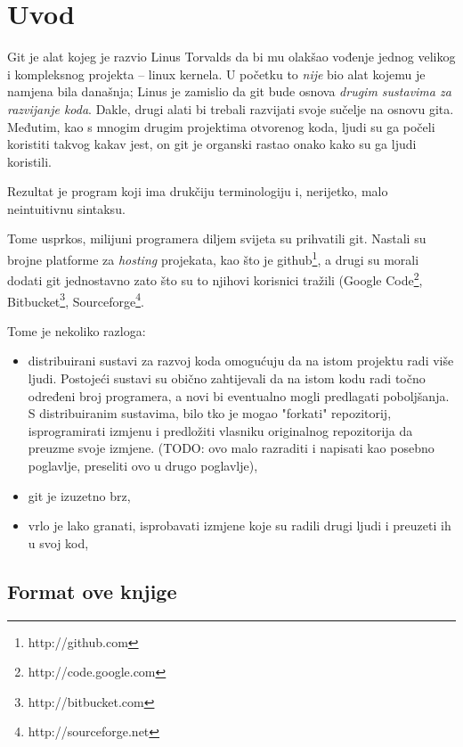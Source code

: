 \chapter*{Uvod}

Git je alat kojeg je razvio Linus Torvalds da bi mu olakšao vođenje jednog velikog i kompleksnog projekta -- linux kernela.
U početku to \textit{nije} bio alat kojemu je namjena bila današnja; Linus je zamislio da git bude osnova \textit{drugim sustavima za razvijanje koda}.
Dakle, drugi alati bi trebali razvijati svoje sučelje na osnovu gita.
Međutim, kao s mnogim drugim projektima otvorenog koda, ljudi su ga počeli koristiti takvog kakav jest, on git je organski rastao onako kako su ga ljudi koristili.

Rezultat je program koji ima drukčiju terminologiju i, nerijetko, malo neintuitivnu sintaksu. 

Tome usprkos, milijuni programera diljem svijeta su prihvatili git. 
Nastali su brojne platforme za \textit{hosting} projekata, kao što je github\footnote{http://github.com}, a drugi su morali dodati git jednostavno zato što su to njihovi korisnici tražili (Google Code\footnote{http://code.google.com}, Bitbucket\footnote{http://bitbucket.com}, Sourceforge\footnote{http://sourceforge.net}.

Tome je nekoliko razloga:

\begin{itemize}
	\item distribuirani sustavi za razvoj koda omogućuju da na istom projektu radi više ljudi. Postojeći sustavi su obično zahtijevali da na istom kodu radi točno određeni broj programera, a novi bi eventualno mogli predlagati poboljšanja. S distribuiranim sustavima, bilo tko je mogao "forkati" repozitorij, isprogramirati izmjenu i predložiti vlasniku originalnog repozitorija da preuzme svoje izmjene. (TODO: ovo malo razraditi i napisati kao posebno poglavlje, preseliti ovo u drugo poglavlje),
	\item git je izuzetno brz,
	\item vrlo je lako granati, isprobavati izmjene koje su radili drugi ljudi i preuzeti ih u svoj kod,
\end{itemize}

\section*{Format ove knjige}

